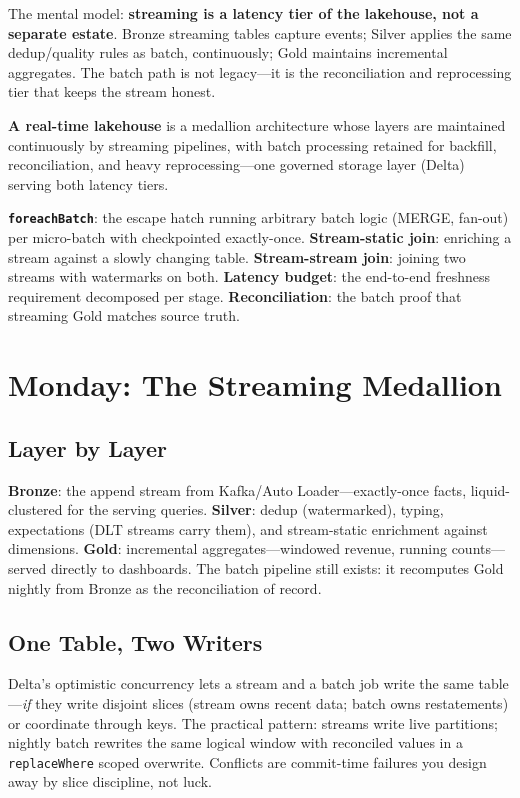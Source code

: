 The mental model: \textbf{streaming is a latency tier of the lakehouse, not a separate estate}. Bronze streaming tables capture events; Silver applies the same dedup/quality rules as batch, continuously; Gold maintains incremental aggregates. The batch path is not legacy---it is the reconciliation and reprocessing tier that keeps the stream honest.

\begin{definitionbox}
\textbf{A real-time lakehouse} is a medallion architecture whose layers are maintained continuously by streaming pipelines, with batch processing retained for backfill, reconciliation, and heavy reprocessing---one governed storage layer (Delta) serving both latency tiers.
\end{definitionbox}

\begin{keyterms}
\textbf{\texttt{foreachBatch}}: the escape hatch running arbitrary batch logic (MERGE, fan-out) per micro-batch with checkpointed exactly-once. \textbf{Stream-static join}: enriching a stream against a slowly changing table. \textbf{Stream-stream join}: joining two streams with watermarks on both. \textbf{Latency budget}: the end-to-end freshness requirement decomposed per stage. \textbf{Reconciliation}: the batch proof that streaming Gold matches source truth.
\end{keyterms}

\section{Monday: The Streaming Medallion}
\subsection{Layer by Layer}
\textbf{Bronze}: the append stream from Kafka/Auto Loader---exactly-once facts, liquid-clustered for the serving queries. \textbf{Silver}: dedup (watermarked), typing, expectations (DLT streams carry them), and stream-static enrichment against dimensions. \textbf{Gold}: incremental aggregates---windowed revenue, running counts---served directly to dashboards. The batch pipeline still exists: it recomputes Gold nightly from Bronze as the reconciliation of record.

\subsection{One Table, Two Writers}
Delta's optimistic concurrency lets a stream and a batch job write the same table---\emph{if} they write disjoint slices (stream owns recent data; batch owns restatements) or coordinate through keys. The practical pattern: streams write live partitions; nightly batch rewrites the same logical window with reconciled values in a \texttt{replaceWhere} scoped overwrite. Conflicts are commit-time failures you design away by slice discipline, not luck.

